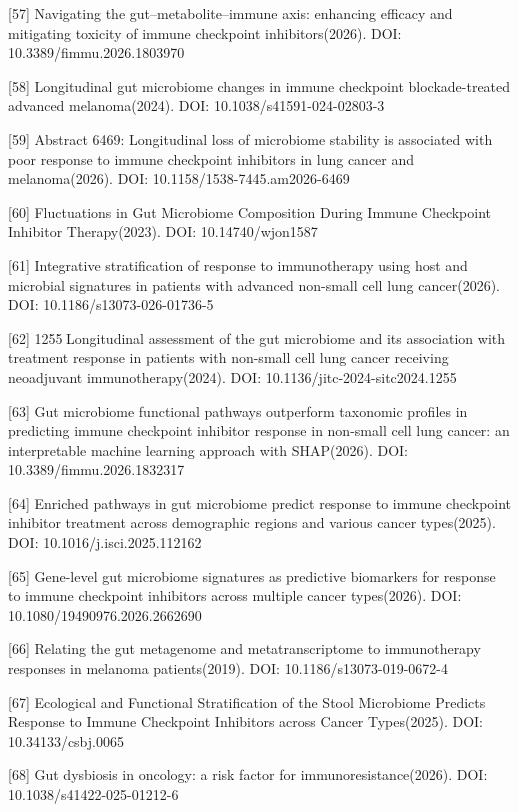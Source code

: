{[}57{]} Navigating the gut--metabolite--immune axis: enhancing efficacy and mitigating toxicity of immune checkpoint inhibitors(2026). DOI: 10.3389/fimmu.2026.1803970

{[}58{]} Longitudinal gut microbiome changes in immune checkpoint blockade-treated advanced melanoma(2024). DOI: 10.1038/s41591-024-02803-3

{[}59{]} Abstract 6469: Longitudinal loss of microbiome stability is associated with poor response to immune checkpoint inhibitors in lung cancer and melanoma(2026). DOI: 10.1158/1538-7445.am2026-6469

{[}60{]} Fluctuations in Gut Microbiome Composition During Immune Checkpoint Inhibitor Therapy(2023). DOI: 10.14740/wjon1587

{[}61{]} Integrative stratification of response to immunotherapy using host and microbial signatures in patients with advanced non-small cell lung cancer(2026). DOI: 10.1186/s13073-026-01736-5

{[}62{]} 1255 Longitudinal assessment of the gut microbiome and its association with treatment response in patients with non-small cell lung cancer receiving neoadjuvant immunotherapy(2024). DOI: 10.1136/jitc-2024-sitc2024.1255

{[}63{]} Gut microbiome functional pathways outperform taxonomic profiles in predicting immune checkpoint inhibitor response in non-small cell lung cancer: an interpretable machine learning approach with SHAP(2026). DOI: 10.3389/fimmu.2026.1832317

{[}64{]} Enriched pathways in gut microbiome predict response to immune checkpoint inhibitor treatment across demographic regions and various cancer types(2025). DOI: 10.1016/j.isci.2025.112162

{[}65{]} Gene-level gut microbiome signatures as predictive biomarkers for response to immune checkpoint inhibitors across multiple cancer types(2026). DOI: 10.1080/19490976.2026.2662690

{[}66{]} Relating the gut metagenome and metatranscriptome to immunotherapy responses in melanoma patients(2019). DOI: 10.1186/s13073-019-0672-4

{[}67{]} Ecological and Functional Stratification of the Stool Microbiome Predicts Response to Immune Checkpoint Inhibitors across Cancer Types(2025). DOI: 10.34133/csbj.0065

{[}68{]} Gut dysbiosis in oncology: a risk factor for immunoresistance(2026). DOI: 10.1038/s41422-025-01212-6

